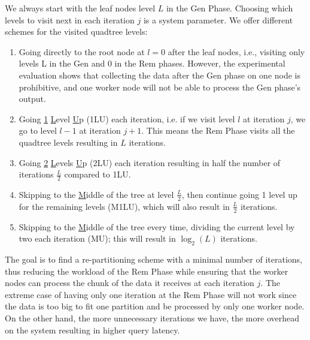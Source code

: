 We always start with the leaf nodes level $L$ in the Gen Phase. Choosing which levels to visit next in each iteration $j$ is a system parameter. 
We offer different schemes for the visited quadtree levels: 
\begin{enumerate}
    \item Going directly to the root node at $l=0$ after the leaf nodes, i.e., visiting only levels L in the Gen and 0 in the Rem phases. However, the experimental evaluation shows that collecting the data after the Gen phase on one node is prohibitive, and one worker node will not be able to process the Gen phase's output.
    \item Going \underline{1} \underline{L}evel \underline{U}p (1LU) each iteration, i.e. if we visit level $l$ at iteration $j$, we go to level $l-1$ at iteration $j+1$. This means the Rem Phase visits all the quadtree levels resulting in $L$ iterations.
    \item Going \underline{2} \underline{L}evels \underline{U}p (2LU) each iteration resulting in half the number of iterations $\frac{L}{2}$ compared to 1LU.
    \item Skipping to the \underline{M}iddle of the tree at level $\frac{L}{2}$, then continue going 1 level up for the remaining levels (M1LU), which will also result in $\frac{L}{2}$ iterations.
    \item Skipping to the \underline{M}iddle of the tree every time, dividing the current level by two each iteration (MU); this will result in $\log_2(L)$ iterations.
\end{enumerate}
The goal is to find a re-partitioning scheme with a minimal number of iterations, thus reducing the workload of the Rem Phase while ensuring that the worker nodes can process the chunk of the data it receives at each iteration $j$.
The extreme case of having only one iteration at the Rem Phase will not work since the data is too big to fit one partition and be processed by only one worker node. On the other hand, the more unnecessary iterations we have, the more overhead on the system resulting in higher query latency.
